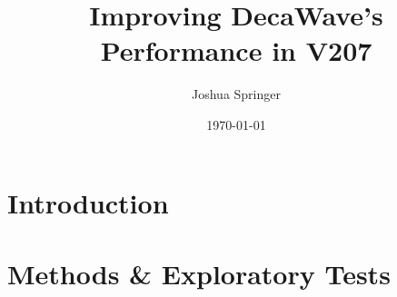 \documentclass[conference]{IEEEtran}
\author{Joshua Springer}
\title{Improving DecaWave's Performance in V207}
\date{\today}
\begin{document}
    \maketitle

    \section{Introduction}
    

    \section{Methods \& Exploratory Tests}
    

    
    
\end{document}
